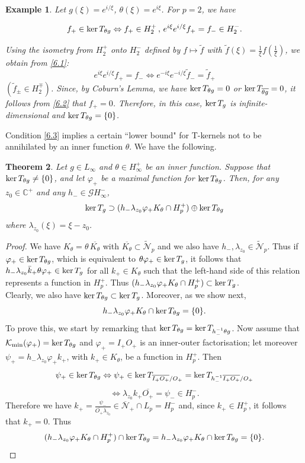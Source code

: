 \documentclass[11pt]{article}
\def\CC{\mathbb{C}}
\def\ker{\mathop{\rm ker}\nolimits}
\renewcommand\phi{\varphi}
\newtheorem{thm}{Theorem}[section]
\newtheorem{ex}[thm]{Example}
\numberwithin{equation}{section}
\def\beginpf{\begin{proof}}
\def\endpf{\end{proof}}
\def\beq{\begin{equation}}
\def\eeq{\end{equation}}
\begin{document}
\begin{ex}
Let $g(\xi)=e^{i /\xi}$, $\theta(\xi)=e^{i\xi}$. For $p=2$, we have

\beq\label{6.1}
f_+ \in \ker T_{\theta g} \Leftrightarrow f_+ \in H_2^+\, ,\, e^{i\xi}e^{i /\xi}f_+=f_- \in H_2^-.
\eeq

Using the isometry from $H_2^+$ onto $H_2^-$ defined by $f\mapsto \tilde{f}$ with $\tilde{f}(\xi)=\frac{1}{\xi}f(\frac{1}{\xi})$, we obtain from \eqref{6.1}:
\beq\label{6.2}
 e^{i\xi}e^{i /\xi}f_+=f_-  \Leftrightarrow e^{-i\xi}e^{-i /\xi}\tilde{f}_-=\tilde{f}_+
\eeq
$(\tilde{f}_\pm\in H_2^\mp) $. Since, by Coburn's Lemma, we have $\ker T_{\theta g}=0$ or $\ker T_{\overline{\theta g}}=0$, it follows from \eqref{6.2} that $f_+=0$. 
Therefore, in this case, $\ker T_g$ is infinite-dimensional and $\ker T_{\theta g}=\{0\}$.
\end{ex}



Condition \eqref{6.3} implies a certain ``lower bound" for T-kernels not to be annihilated by an inner function $\theta$. We have the following.

\begin{thm}\label{theor:6.41}
Let $g \in L_\infty$ and $\theta\in H_\infty^+$ be an inner function. 
Suppose that $\ker T_{\theta g}\neq \{0\}$, and let $\phi_+$ be a maximal function for $\ker T_{\theta g}$. Then, for any $z_0\in \CC^+$ and any $h_- \in \mathcal{G}H_\infty^-$,
\beq\label{6.6}
\ker T_{g} \supset (h_-\lambda_{z_0}\phi_+K_\theta \cap H_p^+)\oplus \ker T_{\theta g}
\eeq
where $\lambda_{z_0}(\xi)=\xi-z_0$.
\end{thm}

\beginpf
We have $K_\theta =\theta\, \overline{K_\theta}$ with $\overline{K_\theta}\subset \widetilde{\mathcal{N}}_p$ and we also have $h_-, \lambda_{z_0} \in \widetilde{\mathcal{N}}_p$. Thus if $\phi_+ \in \ker T_{\theta g}$, which is equivalent to $\theta\phi_+ \in \ker T_{g}$, it follows that $h_-\lambda_{z_0}\bar{k}_+\theta\phi_+ \in \ker T_g$ for all $k_+ \in K_\theta$ such that the left-hand side of this relation represents a function in $H_p^+$. Thus $(h_-\lambda_{z_0}\phi_+K_\theta \cap H_p^+) \subset \ker T_g$.\\
Clearly, we also have $\ker T_{\theta g}\subset \ker T_g$. Moreover, as we show next,
\beq\label{6.7}
h_-\lambda_{z_0}\phi_+K_\theta \cap \ker T_{\theta g} = \{0\}.
\eeq
To prove this, we start by remarking that $\ker T_{\theta g}=\ker T_{h_-^{-1}\theta g}$. Now assume that $\mathcal{K}_{\min}(\phi_+)=\ker T_{\theta g}$ and $\phi_+=I_+O_+$ is an inner-outer factorisation; let moreover $\psi_+=h_-\lambda_{z_0}\phi_+k_+$, with $k_+ \in K_\theta$, be a function in $H_p^+$. Then
\[\psi_+ \in \ker T_{\theta g}\Leftrightarrow \psi_+ \in \ker T_{\overline{I_+} \overline{O_+}/O_+} = \ker T_{h_-^{-1}\overline{I_+} \overline{O_+}/O_+}\]
\[\Leftrightarrow \lambda_{z_0}k_+\overline{O_+}=\psi_- \in H_p^-.\]
Therefore we have $k_+=\frac{\psi_-}{\overline{O_+}\lambda_{z_0}} \in \overline{\mathcal{N}}_+\cap L_p =H_p^-$ and, since $k_+ \in H_p^+$, it follows that $k_+=0$. Thus
\[ (h_-\lambda_{z_0}\phi_+K_\theta \cap H_p^+)\cap \ker T_{\theta g}=h_-\lambda_{z_0}\phi_+K_\theta\cap \ker T_{\theta g}=\{0\}.\]
\endpf
\end{document}
